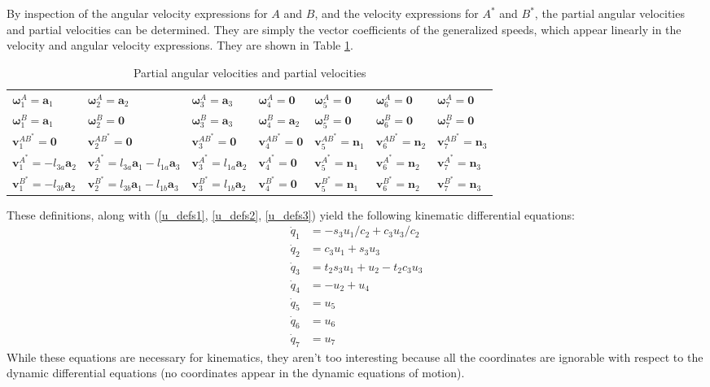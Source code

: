\documentclass[letterpaper,11pt]{article}
\newcommand{\bs}[1]{ \boldsymbol{ #1 } }
\begin{document}
By inspection of the angular velocity expressions for $A$ and $B$, and the
velocity expressions for $A^*$ and $B^*$, the partial angular velocities and
partial velocities can be determined.  They are simply the vector coefficients
of the generalized speeds, which appear linearly in the velocity and angular
velocity expressions.  They are shown in Table \ref{partialvelocities}.

\begin{table}[!h]
  \begin{center}
    \begin{tabular}{lllllll}
      $\bs{\omega}^A_1 = \bs{a}_1$ & $\bs{\omega}^A_2 = \bs{a}_2$ &
      $\bs{\omega}^A_3 = \bs{a}_3$ & $\bs{\omega}^A_4 = \bs{0}$ &
      $\bs{\omega}^A_5 = \bs{0}$ & $\bs{\omega}^A_6 = \bs{0}$ &
      $\bs{\omega}^A_7 = \bs{0}$ \\
%
      $\bs{\omega}^B_1 = \bs{a}_1$ & $\bs{\omega}^B_2 = \bs{0}$ &
      $\bs{\omega}^B_3 = \bs{a}_3$ & $\bs{\omega}^B_4 = \bs{a}_2$ &
      $\bs{\omega}^B_5 = \bs{0}$ & $\bs{\omega}^B_6 = \bs{0}$ &
      $\bs{\omega}^B_7 = \bs{0}$ \\
%
      $\bs{v}^{AB^*}_1 = \bs{0}$ & $\bs{v}^{AB^*}_2 =
      \bs{0}$ & $\bs{v}^{AB^*}_3 = \bs{0}$ &
      $\bs{v}^{AB^*}_4 = \bs{0}$ & $\bs{v}^{AB^*}_5 = \bs{n}_1$ & $\bs{v}^{AB^*}_6
      = \bs{n}_2$ & $\bs{v}^{AB^*}_7 = \bs{n}_3$ \\
%
      $\bs{v}^{A^*}_1 = -l_{3a}\bs{a}_2$ & $\bs{v}^{A^*}_2 =
      l_{3a}\bs{a}_1 - l_{1a}\bs{a}_3$ & $\bs{v}^{A^*}_3 = l_{1a} \bs{a}_2$ &
      $\bs{v}^{A^*}_4 = \bs{0}$ & $\bs{v}^{A^*}_5 = \bs{n}_1$ & $\bs{v}^{A^*}_6
      = \bs{n}_2$ & $\bs{v}^{A^*}_7 = \bs{n}_3$ \\
%
        $\bs{v}^{B^*}_1 = -l_{3b}\bs{a}_2$ & $\bs{v}^{B^*}_2 = l_{3b}\bs{a}_1 -
        l_{1b}\bs{a}_3$ & $\bs{v}^{B^*}_3 = l_{1b} \bs{a}_2$ & $\bs{v}^{B^*}_4
        = \bs{0}$ & $\bs{v}^{B^*}_5 = \bs{n}_1$ & $\bs{v}^{B^*}_6 = \bs{n}_2$ &
        $\bs{v}^{B^*}_7 = \bs{n}_3$
%
    \end{tabular}
  \end{center}
  \caption{Partial angular velocities and partial velocities}
  \label{partialvelocities}
\end{table}

These definitions, along with (\ref{u_defs1}, \ref{u_defs2}, \ref{u_defs3})
yield the following kinematic differential equations:
\begin{align*}
  \dot{q}_1 &=  -s_3u_1/c_2 + c_3u_3/c_2\\
  \dot{q}_2 &=  c_3u_1 + s_3u_3 \\
  \dot{q}_3 &=  t_2s_3u_1 + u_2 - t_2c_3u_3 \\
  \dot{q}_4 &= -u_2 +  u_4 \\
  \dot{q}_5 &= u_5 \\
  \dot{q}_6 &= u_6 \\
  \dot{q}_7 &= u_7
\end{align*}
While these equations are necessary for kinematics, they aren't too interesting
because all the coordinates are ignorable with respect to the dynamic
differential equations (no coordinates appear in the dynamic equations of
motion).
\end{document}
